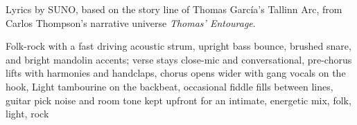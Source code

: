 
\begin{notes}
Lyrics by SUNO, based on the story line of Thomas García's Tallinn Arc, from Carlos Thompson's narrative universe \emph{Thomas’ Entourage}.
\end{notes}
\begin{style}
Folk-rock with a fast driving acoustic strum, upright bass bounce, brushed snare, and bright mandolin accents; verse stays close-mic and conversational, pre-chorus lifts with harmonies and handclaps, chorus opens wider with gang vocals on the hook, Light tambourine on the backbeat, occasional fiddle fills between lines, guitar pick noise and room tone kept upfront for an intimate, energetic mix, folk, light, rock
\end{style}
